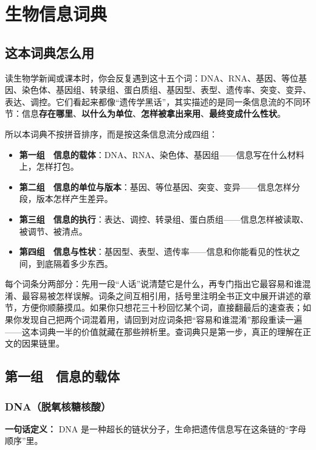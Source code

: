 \chapter{生物信息词典}

\section*{这本词典怎么用}

读生物学新闻或课本时，你会反复遇到这十五个词：DNA、RNA、基因、等位基因、染色体、基因组、转录组、蛋白质组、基因型、表型、遗传率、突变、变异、表达、调控。它们看起来都像“遗传学黑话”，其实描述的是同一条信息流的不同环节：信息\textbf{存在哪里}、\textbf{以什么为单位}、\textbf{怎样被拿出来用}、\textbf{最终变成什么性状}。

所以本词典不按拼音排序，而是按这条信息流分成四组：

\begin{itemize}[itemsep=2pt]
\item \textbf{第一组　信息的载体}：DNA、RNA、染色体、基因组——信息写在什么材料上，怎样打包。
\item \textbf{第二组　信息的单位与版本}：基因、等位基因、突变、变异——信息怎样分段，版本怎样产生差异。
\item \textbf{第三组　信息的执行}：表达、调控、转录组、蛋白质组——信息怎样被读取、被调节、被清点。
\item \textbf{第四组　信息与性状}：基因型、表型、遗传率——信息和你能看见的性状之间，到底隔着多少东西。
\end{itemize}

每个词条分两部分：先用一段“人话”说清楚它是什么，再专门指出它最容易和谁混淆、最容易被怎样误解。词条之间互相引用，括号里注明全书正文中展开讲述的章节，方便你顺藤摸瓜。如果你只想花三十秒回忆某个词，直接翻最后的速查表；如果你发现自己把两个词混着用，请回到对应词条把“容易和谁混淆”那段重读一遍——这本词典一半的价值就藏在那些辨析里。查词典只是第一步，真正的理解在正文的因果链里。

\section{第一组　信息的载体}

\subsection{DNA（脱氧核糖核酸）}

\textbf{一句话定义：} DNA 是一种超长的链状分子，生命把遗传信息写在这条链的“字母顺序”里。

